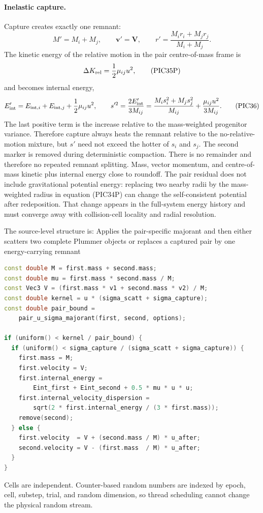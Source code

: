 \paragraph{Inelastic capture.}
Capture creates exactly one remnant:
\[
 M'=M_i+M_j,\qquad \bm v'=\bm V,\qquad
 r'=\frac{M_ir_i+M_jr_j}{M_i+M_j}.                        \tag{PIC34P}
\]
The kinetic energy of the relative motion in the pair centre-of-mass frame is
\[
 \Delta K_{\rm rel}=\frac12\mu_{ij}u^2,                   \tag{PIC35P}
\]
and becomes internal energy,
\[
 E_{\rm int}'=E_{{\rm int},i}+E_{{\rm int},j}
              +\frac12\mu_{ij}u^2,\qquad
 s'^2=\frac{2E_{\rm int}'}{3M_{ij}}
 =\frac{M_i s_i^2+M_j s_j^2}{M_{ij}}
  +\frac{\mu_{ij}u^2}{3M_{ij}}.                          \tag{PIC36}
\]
The last positive term is the increase relative to the mass-weighted
progenitor variance.  Therefore capture always heats the remnant relative to
the no-relative-motion mixture, but \(s'\) need not exceed the hotter of
\(s_i\) and \(s_j\).
The second marker is removed during deterministic compaction.  There is no
remainder and therefore no repeated remnant splitting.  Mass, vector
momentum, and centre-of-mass kinetic plus internal energy close to roundoff.
The pair residual does not include gravitational potential energy: replacing
two nearby radii by the mass-weighted radius in equation (PIC34P) can change
the self-consistent potential after redeposition.  That change appears in the
full-system energy history and must converge away with collision-cell
locality and radial resolution.

The source-level structure is:
{}
{Applies the pair-specific majorant and then either scatters two complete
 Plummer objects or replaces a captured pair by one energy-carrying remnant}
\begin{lstlisting}[language=C++,basicstyle=\ttfamily\scriptsize]
const double M = first.mass + second.mass;
const double mu = first.mass * second.mass / M;
const Vec3 V = (first.mass * v1 + second.mass * v2) / M;
const double kernel = u * (sigma_scatt + sigma_capture);
const double pair_bound =
    pair_u_sigma_majorant(first, second, options);

if (uniform() < kernel / pair_bound) {
  if (uniform() < sigma_capture / (sigma_scatt + sigma_capture)) {
    first.mass = M;
    first.velocity = V;
    first.internal_energy =
        Eint_first + Eint_second + 0.5 * mu * u * u;
    first.internal_velocity_dispersion =
        sqrt(2 * first.internal_energy / (3 * first.mass));
    remove(second);
  } else {
    first.velocity  = V + (second.mass / M) * u_after;
    second.velocity = V - (first.mass  / M) * u_after;
  }
}
\end{lstlisting}
Cells are independent.  Counter-based random numbers are indexed by epoch,
cell, substep, trial, and random dimension, so thread scheduling cannot
change the physical random stream.


